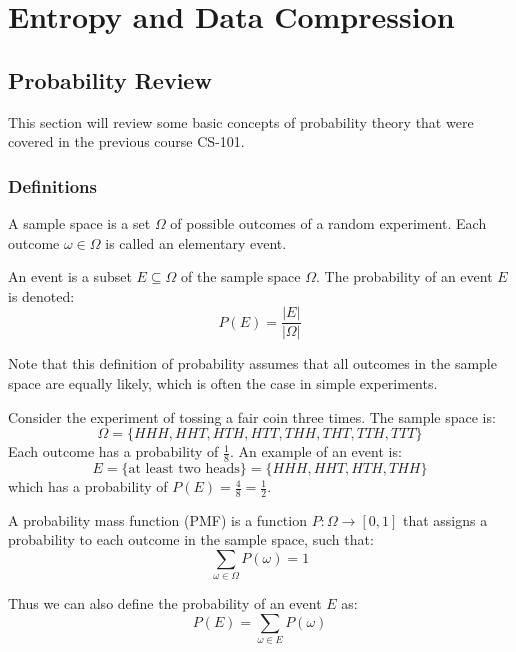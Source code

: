 \chapter{Entropy and Data Compression}

\section{Probability Review}
This section will review some basic concepts of probability theory that were covered in the previous course CS-101.

\subsection{Definitions}
\begin{definition}
    A sample space is a set $\Omega$ of possible outcomes of a random experiment. Each outcome $\omega \in \Omega$ is called an elementary event.
\end{definition}

\begin{definition}[Event]
    An event is a subset $E \subseteq \Omega$ of the sample space $\Omega$. The probability of an event $E$ is denoted:
    \[
        P(E) = \frac{|E|}{|\Omega|}
    \]
\end{definition}
Note that this definition of probability assumes that all outcomes in the sample space are equally likely, which is often the case in simple experiments.

\begin{eg}
    Consider the experiment of tossing a fair coin three times. The sample space is:
    \[
        \Omega = \{HHH, HHT, HTH, HTT, THH, THT, TTH, TTT\}
    \]
    Each outcome has a probability of $\frac{1}{8}$. An example of an event is:
    \[
        E = \{\text{at least two heads}\} = \{HHH, HHT, HTH, THH\}
    \]
    which has a probability of $P(E) = \frac{4}{8} = \frac{1}{2}$.
\end{eg}

\begin{definition}
    A probability mass function (PMF) is a function $P: \Omega \to [0,1]$ that assigns a probability to each outcome in the sample space, such that:
    \[
        \sum_{\omega \in \Omega} P(\omega) = 1
    \]
\end{definition}
Thus we can also define the probability of an event $E$ as:
\[
    P(E) = \sum_{\omega \in E} P(\omega)
\]

